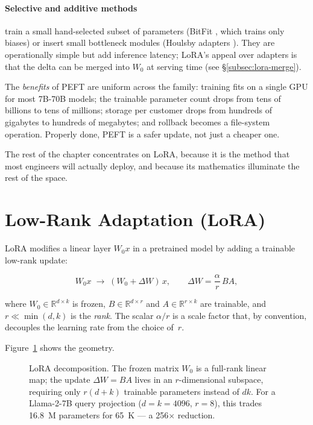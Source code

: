 \paragraph{Selective and additive methods} train a small
hand-selected subset of parameters (BitFit
\citep{zaken2022bitfit}, which trains only biases) or insert small
bottleneck modules (Houlsby adapters \citep{houlsby2019adapters}).
They are operationally simple but add inference latency; LoRA's
appeal over adapters is that the delta can be merged into $W_0$ at
serving time (see \S\ref{subsec:lora-merge}).

The \emph{benefits} of PEFT are uniform across the family:
training fits on a single GPU for most 7B-70B models;
the trainable parameter count drops from tens of billions to tens of
millions; storage per customer drops from hundreds of gigabytes to
hundreds of megabytes; and rollback becomes a file-system operation.
Properly done, PEFT is a safer update, not just a cheaper one.

The rest of the chapter concentrates on LoRA, because it is the
method that most engineers will actually deploy, and because its
mathematics illuminate the rest of the space.

\section{Low-Rank Adaptation (LoRA)}

LoRA \citep{hu2021lora} modifies a linear layer $W_0 x$ in a
pretrained model by adding a trainable low-rank update:

\begin{equation}
  W_0 x \;\longrightarrow\; (W_0 + \Delta W)\,x,
  \qquad
  \Delta W = \frac{\alpha}{r}\, B A,
  \label{eq:lora-core}
\end{equation}

where $W_0 \in \mathbb{R}^{d\times k}$ is frozen,
$B \in \mathbb{R}^{d\times r}$ and $A \in \mathbb{R}^{r\times k}$ are
trainable, and $r \ll \min(d,k)$ is the \emph{rank}. The scalar
$\alpha/r$ is a scale factor that, by convention, decouples the learning
rate from the choice of~$r$.

Figure~\ref{fig:lora-decomp} shows the geometry.

\begin{figure}[ht]
  \centering
  
  \caption{LoRA decomposition. The frozen matrix $W_0$ is a full-rank
  linear map; the update $\Delta W = BA$ lives in an $r$-dimensional
  subspace, requiring only $r(d+k)$ trainable parameters instead of
  $dk$. For a Llama-2-7B query projection ($d=k=4096$, $r=8$), this
  trades 16.8~M parameters for 65~K --- a 256$\times$ reduction.}
  \label{fig:lora-decomp}
\end{figure}

